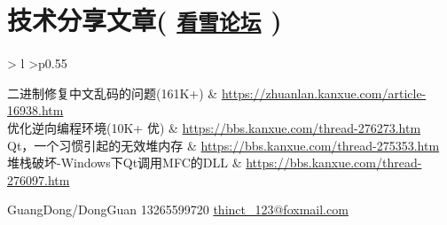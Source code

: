 \documentclass[lighthipster]{simplehipstercv}
\newcommand{\hiddenlink}[2]{%
	\href{#1}{\texttt{#2}}%
}
\begin{document}
	\begin{minipage}[t]{\textwidth}
		\section*{技术分享文章(\hiddenlink{https://bbs.kanxue.com/homepage-940598.htm}{看雪论坛})}
		\begin{tabular}{>{\scriptsize\bfseries\linespread{1.6} \selectfont}l >{\footnotesize}p{0.55\textwidth}}
			
			二进制修复中文乱码的问题(161K+) & \href{https://zhuanlan.kanxue.com/article-16938.htm}{https://zhuanlan.kanxue.com/article-16938.htm} \\
			优化逆向编程环境(10K+ 优) & \href{https://bbs.kanxue.com/thread-276273.htm}{https://bbs.kanxue.com/thread-276273.htm} \\
			Qt，一个习惯引起的无效堆内存 & \href{https://bbs.kanxue.com/thread-275353.htm}{https://bbs.kanxue.com/thread-275353.htm} \\
			堆栈破坏-Windows下Qt调用MFC的DLL & \href{https://bbs.kanxue.com/thread-276097.htm}{https://bbs.kanxue.com/thread-276097.htm}
		\end{tabular}
		\bigskip
	\end{minipage}
	
	\vspace{3em}
	
	\vfill{} %
	
	\setlength{\parindent}{0pt}
	\begin{minipage}[t]{\linewidth}
		\begin{flushright}\fontfamily{\sfdefault}\selectfont \color{black!70}
			{ GuangDong/DongGuan  13265599720  \protect\url{thinct_123@foxmail.com}
			}
		\end{flushright}
	\end{minipage}
	
\end{document}
